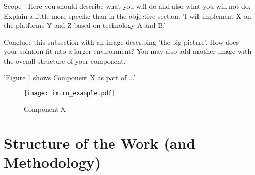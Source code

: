 Scope - Here you should describe what you will do and also what you will not do. Explain a little more specific than in the objective section. 'I will implement X on the platforms Y and Z based on technology A and B.'

Conclude this subsection with an image describing 'the big picture'. How does your solution fit into a larger environment? You may also add another image with the overall structure of your component.

'Figure \ref{fig:intro} shows Component X as part of ...' 
\\
\begin{figure}[htb]
  \centering
  \texttt{[image: intro\_example.pdf]}\\
  \caption{Component X}\label{fig:intro}
\end{figure}

\section{Structure of the Work (and Methodology) \label{sec:outline}}

